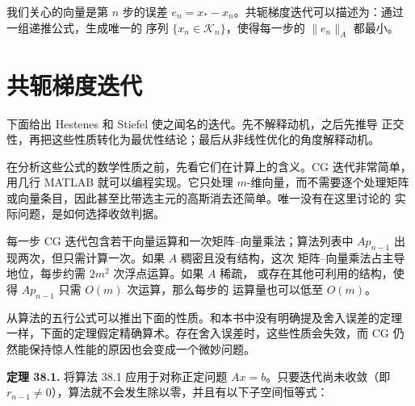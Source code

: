 \documentclass[UTF8,fontset=none,12pt]{ctexart}
\begin{document}
我们关心的向量是第 $n$ 步的误差
$e_n=x_\ast-x_n$。共轭梯度迭代可以描述为：通过一组递推公式，生成唯一的
序列 $\{x_n\in\mathcal K_n\}$，使得每一步的 $\lVert e_n\rVert_A$ 都最小。

\section*{共轭梯度迭代}

下面给出 Hestenes 和 Stiefel 使之闻名的迭代。先不解释动机，之后先推导
正交性，再把这些性质转化为最优性结论；最后从非线性优化的角度解释动机。

\begin{center}
\end{center}

在分析这些公式的数学性质之前，先看它们在计算上的含义。CG 迭代非常简单，
用几行 MATLAB 就可以编程实现。它只处理 $m$-维向量，而不需要逐个处理矩阵
或向量条目，因此甚至比带选主元的高斯消去还简单。唯一没有在这里讨论的
实际问题，是如何选择收敛判据。

每一步 CG 迭代包含若干向量运算和一次矩阵--向量乘法；算法列表中
$Ap_{n-1}$ 出现两次，但只需计算一次。如果 $A$ 稠密且没有结构，这次
矩阵--向量乘法占主导地位，每步约需 $2m^2$ 次浮点运算。如果 $A$ 稀疏，
或存在其他可利用的结构，使得 $Ap_{n-1}$ 只需 $O(m)$ 次运算，那么每步的
运算量也可以低至 $O(m)$。

从算法的五行公式可以推出下面的性质。和本书中没有明确提及舍入误差的定理
一样，下面的定理假定精确算术。存在舍入误差时，这些性质会失效，而 CG
仍然能保持惊人性能的原因也会变成一个微妙问题。

\textbf{定理 38.1.}
将算法 38.1 应用于对称正定问题 $Ax=b$。只要迭代尚未收敛（即
$r_{n-1}\ne0$），算法就不会发生除以零，并且有以下子空间恒等式：
\end{document}

